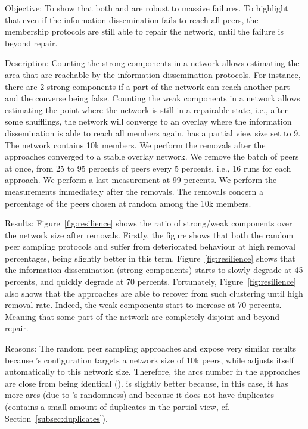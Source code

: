 \begin{asparadesc}
\item[Objective:] To show that both \SPRAY and \CYCLON are robust to massive
   failures. To highlight that even if the information
  dissemination fails to reach all peers, the membership protocols are still
  able to repair the network, until the failure is beyond repair.
\item[Description:] Counting the strong components in a network allows
  estimating the area that are reachable by the information dissemination
  protocols. For instance, there are 2 strong components if a part of the
  network can reach another part and the converse being false.  Counting the
  weak components in a network allows estimating the point where the network is
  still in a repairable state, i.e., after some shufflings, the network will
  converge to an overlay where the information dissemination is able to reach
  all members again. \CYCLON has a partial view size set to 9. The network
  contains 10k members. We perform the removals after the approaches converged
  to a stable overlay network. We remove the batch of peers at once, from 25 to
  95 percents of peers every 5 percents, i.e., 16 runs for each approach. We
  perform a last measurement at 99 percents. We perform the measurements
  immediately after the removals. The removals concern a percentage of the
  peers chosen at random among the 10k members.
\item[Results:] Figure~\ref{fig:resilience} shows the ratio of strong/weak
  components over the network size after removals. Firstly, the figure shows
  that both the random peer sampling protocols \SPRAY and \CYCLON suffer from
  deteriorated behaviour at high removal percentages, \CYCLON being slightly
  better in this term. Figure~\ref{fig:resilience} shows that the information
  dissemination (strong components) starts to slowly degrade at 45 percents,
  and quickly degrade at 70 percents. Fortunately, Figure~\ref{fig:resilience}
  also shows that the approaches are able to recover from such clustering until
  high removal rate. Indeed, the weak components start to increase at 70
  percents. Meaning that some part of the network are completely disjoint and
  beyond repair.
\item[Reasons:] The random peer sampling approaches \CYCLON and \SPRAY expose
  very similar results because \CYCLON's configuration targets a network size
  of 10k peers, while \SPRAY adjusts itself automatically to this network size.
  Therefore, the arcs number in the approaches are close from being identical
  (). \CYCLON is slightly better because, in this case, it has more
  arcs (due to \SPRAY's randomness) and because it does not have duplicates
  (\SPRAY contains a small amount of duplicates in the partial view,
  cf. Section~\ref{subsec:duplicates}).
\end{asparadesc}

